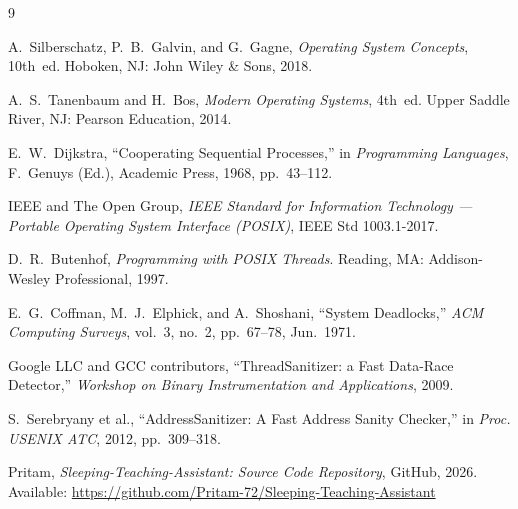 \documentclass[12pt,a4paper]{report}
\begin{document}
\begin{thebibliography}{9}

A.~Silberschatz, P.~B.~Galvin, and G.~Gagne,
\textit{Operating System Concepts}, 10th~ed.
Hoboken, NJ: John Wiley \& Sons, 2018.

A.~S.~Tanenbaum and H.~Bos,
\textit{Modern Operating Systems}, 4th~ed.
Upper Saddle River, NJ: Pearson Education, 2014.

E.~W.~Dijkstra,
``Cooperating Sequential Processes,''
in \textit{Programming Languages}, F.~Genuys (Ed.),
Academic Press, 1968, pp.~43--112.

IEEE and The Open Group,
\textit{IEEE Standard for Information Technology --- Portable Operating System Interface (POSIX)},
IEEE Std 1003.1-2017.

D.~R.~Butenhof,
\textit{Programming with POSIX Threads}.
Reading, MA: Addison-Wesley Professional, 1997.

E.~G.~Coffman, M.~J.~Elphick, and A.~Shoshani,
``System Deadlocks,''
\textit{ACM Computing Surveys}, vol.~3, no.~2, pp.~67--78, Jun.~1971.

Google LLC and GCC contributors,
``ThreadSanitizer: a Fast Data-Race Detector,''
\textit{Workshop on Binary Instrumentation and Applications}, 2009.

S.~Serebryany et al.,
``AddressSanitizer: A Fast Address Sanity Checker,''
in \textit{Proc. USENIX ATC}, 2012, pp.~309--318.

Pritam,
\textit{Sleeping-Teaching-Assistant: Source Code Repository},
GitHub, 2026.
Available: \url{https://github.com/Pritam-72/Sleeping-Teaching-Assistant}

\end{thebibliography}
\end{document}
